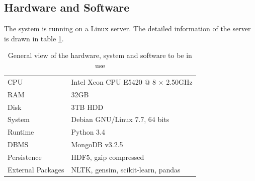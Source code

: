 \bigbreak

\subsection{Hardware and Software}
\label{sec:4.6}

The system is running on a Linux server. The detailed information of the server is drawn in table \ref{tab:pcinfo}.

\begin{table}[!htb]
\centering
\begin{tabular}{ll}
\hline 
CPU & Intel Xeon CPU E5420 @ 8 $\times$ 2.50GHz \\
RAM & 32GB \\ 
Disk & 3TB HDD \\ 
System & Debian GNU/Linux 7.7, 64 bits \\ 
Runtime & Python 3.4 \\
DBMS & MongoDB v3.2.5\\ 
Persistence & HDF5, gzip compressed \\
External Packages & NLTK, gensim, scikit-learn, pandas \\ \hline
\end{tabular}
\caption{General view of the hardware, system and software to be in use}
\label{tab:pcinfo}
\end{table}

